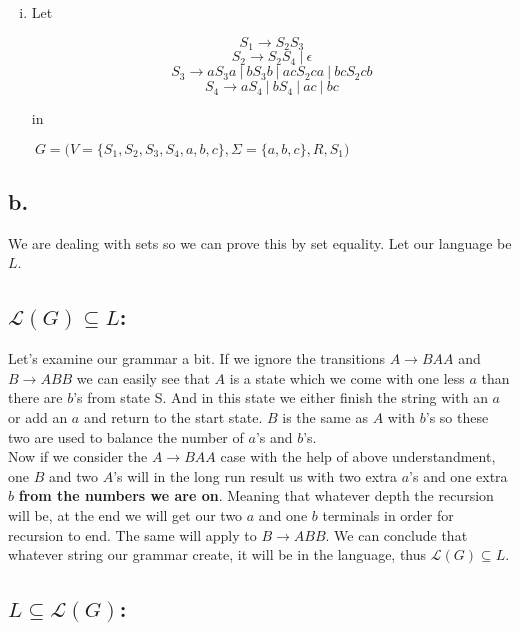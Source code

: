 \documentclass[12pt]{article}
\begin{document}
\begin{enumerate}[(i)]
		\vspace*{-1cm}

		\item
		Let
		\begin{minipage}{0.4\textwidth}
			\vspace*{2.1cm}
			$$S_1 \rightarrow S_2S_3$$
			$$S_2 \rightarrow S_2S_4\ |\ \epsilon$$
			$$S_3 \rightarrow aS_3a\ |\ bS_3b\ |\ acS_2ca\ |\ bcS_2cb$$
			$$S_4 \rightarrow aS_4\ |\ bS_4\ |\ ac\ |\ bc$$
		\end{minipage}
		\hspace{-0.5cm}
		in 
		\begin{minipage}{0.6\textwidth}
			$\ G = \Big(V=\{S_1, S_2, S_3, S_4, a, b, c\}, \Sigma=\{a, b, c\}, R, S_1\Big)$
		\end{minipage}
	\end{enumerate}

\subsection*{b.}
	\qquad We are dealing with sets so we can prove this by set equality. Let our language be $L$.\\

	\subsection*{ $\mathcal{L}(G) \subseteq L$: }

		\qquad Let's examine our grammar a bit. If we ignore the transitions $A \rightarrow BAA$ and $B \rightarrow ABB$ we can easily see that $A$ is a state which we come with one less $a$ than there are $b$'s from state S. And in this state we either finish the string with an $a$ or add an $a$ and return to the start state. $B$ is the same as $A$ with $b$'s so these two are used to balance the number of $a$'s and $b$'s.\\

		\qquad Now if we consider the $A \rightarrow BAA$ case with the help of above understandment, one $B$ and two $A$'s will in the long run result us with two extra $a$'s and one extra $b$ \textbf{from the numbers we are on}. Meaning that whatever depth the recursion will be, at the end we will get our two $a$ and one $b$ terminals in order for recursion to end. The same will apply to $B \rightarrow ABB$. We can conclude that whatever string our grammar create, it will be in the language, thus $\mathcal{L}(G) \subseteq L$.

	\subsection*{ $L \subseteq \mathcal{L}(G)$: }
\end{document}

